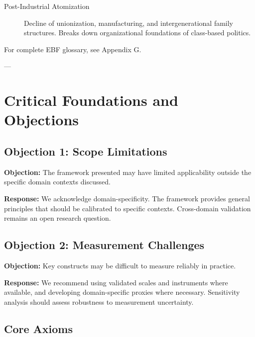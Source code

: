 {{{{{{{{\begin{description}
\item[Post-Industrial Atomization] Decline of unionization, manufacturing, and intergenerational family structures. Breaks down organizational foundations of class-based politics.

\end{description}

For complete EBF glossary, see Appendix G.

---


\section{Critical Foundations and Objections}
\label{sec:bt-foundations}

\subsection{Objection 1: Scope Limitations}

\textbf{Objection:} The framework presented may have limited applicability
outside the specific domain contexts discussed.

\textbf{Response:} We acknowledge domain-specificity. The framework provides
general principles that should be calibrated to specific contexts. Cross-domain
validation remains an open research question.

\subsection{Objection 2: Measurement Challenges}

\textbf{Objection:} Key constructs may be difficult to measure reliably in
practice.

\textbf{Response:} We recommend using validated scales and instruments where
available, and developing domain-specific proxies where necessary. Sensitivity
analysis should assess robustness to measurement uncertainty.



\subsection{Core Axioms}
\label{sec:bt-axioms}

}}}}}}}}

